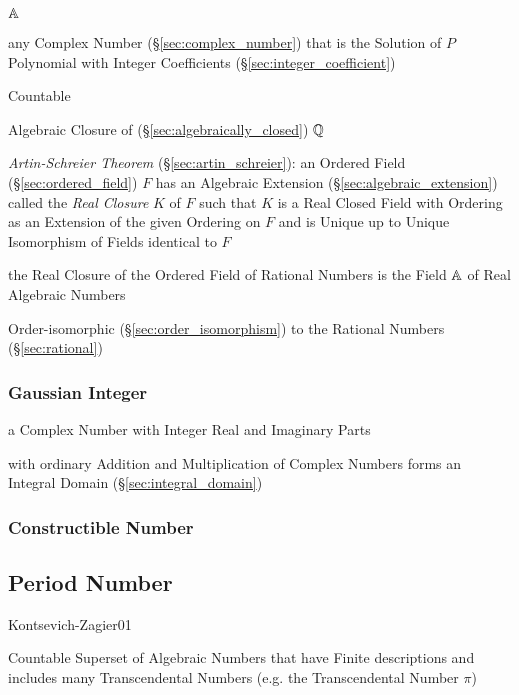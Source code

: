 $\mathbb{A}$

any Complex Number (\S\ref{sec:complex_number}) that is the Solution of $P$
Polynomial with Integer Coefficients (\S\ref{sec:integer_coefficient})

Countable

Algebraic Closure of (\S\ref{sec:algebraically_closed}) $\mathbb{Q}$

\emph{Artin-Schreier Theorem} (\S\ref{sec:artin_schreier}):
an Ordered Field (\S\ref{sec:ordered_field}) $F$ has an Algebraic Extension
(\S\ref{sec:algebraic_extension}) called the \emph{Real Closure} $K$ of $F$
such that $K$ is a Real Closed Field with Ordering as an Extension of the given
Ordering on $F$ and is Unique up to Unique Isomorphism of Fields identical to
$F$

the Real Closure of the Ordered Field of Rational Numbers is the Field
$\mathbb{A}$ of Real Algebraic Numbers

Order-isomorphic (\S\ref{sec:order_isomorphism}) to the Rational
Numbers (\S\ref{sec:rational})



\subsubsection{Gaussian Integer}\label{sec:gaussian_integer}\hfill

a Complex Number with Integer Real and Imaginary Parts

with ordinary Addition and Multiplication of Complex Numbers forms an Integral
Domain (\S\ref{sec:integral_domain})



\subsubsection{Constructible Number}\label{sec:constructible_number}\hfill



\subsection{Period Number}\label{sec:period_number}

Kontsevich-Zagier01

Countable Superset of Algebraic Numbers that have Finite descriptions
and includes many Transcendental Numbers (e.g. the Transcendental
Number $\pi$)



